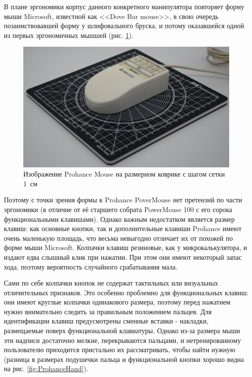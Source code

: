 \documentclass[11pt, a4paper]{article}
\begin{document}
В плане эргономики корпус данного конкретного манипулятора повторяет форму мыши Microsoft, известной как <<Dove Bar mouse>>, в свою очередь позаимствовавшей форму у шлифовального бруска, и потому оказавшейся одной из первых эргономичных мышшей (рис. \ref{fig:ProhanceSize}). 

\begin{figure}[h]
    \centering
    \includegraphics[scale=0.3]{1989_prohance_powermouse/5.3.jpg}
    \caption{Изображение Prohance Mouse на размерном коврике с шагом сетки 1~см}
    \label{fig:ProhanceSize}
\end{figure}

Поэтому с точки зрения формы к Prohance PoverMouse нет претензий по части эргономики (в отличие от её старшего собрата PowerMouse 100 с его сорока функциональными клавишами). Однако важным недостатком является размер клавиш: как основные кнопки, так и дополнительные клавиши Prohance имеют очень маленькую площадь, что весьма невыгодно отличает их от похожей по форме мыши Microsoft. Колпачки клавиш резиновые, как у микрокалькулятора, и издают едва слышный клик при нажатии. При этом они имеют некоторый запас хода, поэтому вероятность случайного срабатывания мала.

Сами по себе колпачки кнопок не содержат тактильных или визуальных отличительных признаков. Это особенно проблемно для функциональных клавиш: они имеют круглые колпачки одинакового размера, поэтому перед нажатием нужно внимательно следить за правильным положением пальцев. Для идентификации клавиш предусмотрены сменные вставки - накладки, размещаемые поверх функциональной клавиатуры. Однако из-за размера мыши эти надписи достаточно мелкие, перекрываются пальцами, и нетренированному пользователю приходится пристально их рассматривать, чтобы найти нужную (разница в размерах подушечки пальца и функциональной кнопки хорошо видна на рис. \ref{fig:ProhanceHand}).
\end{document}
